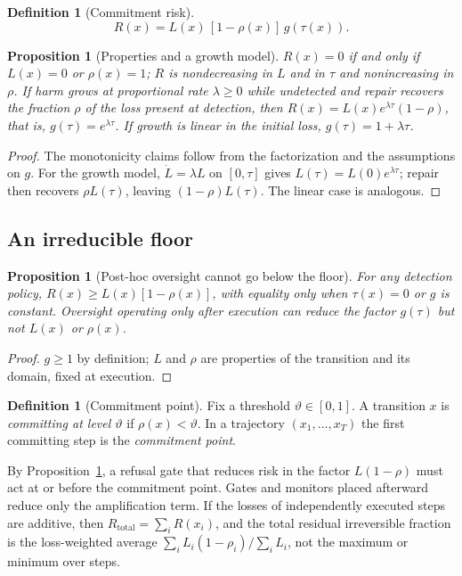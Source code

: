\documentclass[11pt]{article}
\newtheorem{proposition}[theorem]{Proposition}
\theoremstyle{definition}
\newtheorem{definition}[theorem]{Definition}
\begin{document}
\begin{definition}[Commitment risk]
\[
R(x)=L(x)\,[1-\rho(x)]\,g(\tau(x)).
\]
\end{definition}

\begin{proposition}[Properties and a growth model]\label{prop:D1}
$R(x)=0$ if and only if $L(x)=0$ or $\rho(x)=1$; $R$ is nondecreasing in $L$ and in $\tau$ and nonincreasing in $\rho$. If harm grows at proportional rate $\lambda\ge0$ while undetected and repair recovers the fraction $\rho$ of the loss present at detection, then $R(x)=L(x)e^{\lambda\tau}(1-\rho)$, that is, $g(\tau)=e^{\lambda\tau}$. If growth is linear in the initial loss, $g(\tau)=1+\lambda\tau$.
\end{proposition}
\begin{proof}
The monotonicity claims follow from the factorization and the assumptions on $g$. For the growth model, $\dot L=\lambda L$ on $[0,\tau]$ gives $L(\tau)=L(0)e^{\lambda\tau}$; repair then recovers $\rho L(\tau)$, leaving $(1-\rho)L(\tau)$. The linear case is analogous.
\end{proof}

\subsection{An irreducible floor}

\begin{proposition}[Post-hoc oversight cannot go below the floor]\label{prop:D2}
For any detection policy, $R(x)\ge L(x)[1-\rho(x)]$, with equality only when $\tau(x)=0$ or $g$ is constant. Oversight operating only after execution can reduce the factor $g(\tau)$ but not $L(x)$ or $\rho(x)$.
\end{proposition}
\begin{proof}
$g\ge1$ by definition; $L$ and $\rho$ are properties of the transition and its domain, fixed at execution.
\end{proof}

\begin{definition}[Commitment point]
Fix a threshold $\vartheta\in[0,1]$. A transition $x$ is \emph{committing at level $\vartheta$} if $\rho(x)<\vartheta$. In a trajectory $(x_1,\dots,x_T)$ the first committing step is the \emph{commitment point}.
\end{definition}

By Proposition~\ref{prop:D2}, a refusal gate that reduces risk in the factor $L(1-\rho)$ must act at or before the commitment point. Gates and monitors placed afterward reduce only the amplification term. If the losses of independently executed steps are additive, then $R_{\mathrm{total}}=\sum_iR(x_i)$, and the total residual irreversible fraction is the loss-weighted average $\sum_iL_i(1-\rho_i)/\sum_iL_i$, not the maximum or minimum over steps.
\end{document}
